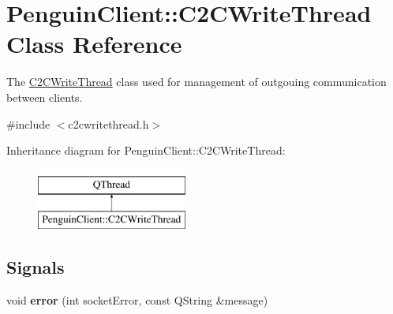 \hypertarget{classPenguinClient_1_1C2CWriteThread}{\section{Penguin\-Client\-:\-:C2\-C\-Write\-Thread Class Reference}
\label{classPenguinClient_1_1C2CWriteThread}
}


The \hyperlink{classPenguinClient_1_1C2CWriteThread}{C2\-C\-Write\-Thread} class used for management of outgouing communication between clients.  




{\ttfamily \#include $<$c2cwritethread.\-h$>$}

Inheritance diagram for Penguin\-Client\-:\-:C2\-C\-Write\-Thread\-:\begin{figure}[H]
\begin{center}
\leavevmode
\includegraphics[height=2.000000cm]{classPenguinClient_1_1C2CWriteThread}
\end{center}
\end{figure}
\subsection*{Signals}
\begin{DoxyCompactItemize}
\item 
\hypertarget{classPenguinClient_1_1C2CWriteThread_a2c82cf0616dcd8064a1bad59d0978e3f}{void {\bfseries error} (int socket\-Error, const Q\-String \&message)}\label{classPenguinClient_1_1C2CWriteThread_a2c82cf0616dcd8064a1bad59d0978e3f}

\end{DoxyCompactItemize}
